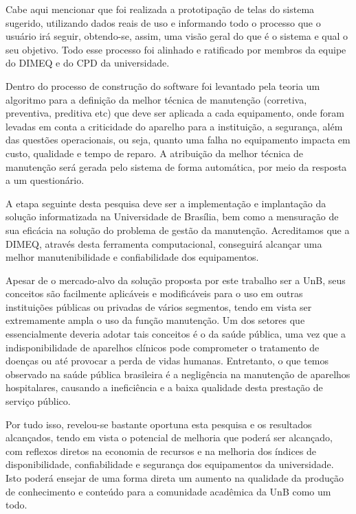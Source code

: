 Cabe aqui mencionar que foi realizada a prototipação de telas do sistema sugerido, utilizando dados reais de uso e informando todo o processo que o usuário irá seguir, obtendo-se, assim, uma visão geral do que é o sistema e qual o seu objetivo. Todo esse processo foi alinhado e ratificado por membros da equipe do DIMEQ e do CPD da universidade.

Dentro do processo de construção do software foi levantado pela teoria um algoritmo para a definição da melhor técnica de manutenção (corretiva, preventiva, preditiva etc) que deve ser aplicada a cada equipamento, onde foram levadas em conta a criticidade do aparelho para a instituição, a segurança, além das questões operacionais, ou seja, quanto uma falha no equipamento impacta em custo, qualidade e tempo de reparo. A atribuição da melhor técnica de manutenção será gerada pelo sistema de forma automática, por meio da resposta a um questionário.

A etapa seguinte desta pesquisa deve ser a implementação e implantação da solução informatizada na Universidade de Brasília, bem como a mensuração de sua eficácia na solução do problema de gestão da manutenção. Acreditamos que a DIMEQ, através desta ferramenta computacional, conseguirá alcançar uma melhor manutenibilidade e confiabilidade dos equipamentos.

Apesar de o mercado-alvo da solução proposta por este trabalho ser a UnB, seus conceitos são facilmente aplicáveis e modificáveis para o uso em outras instituições públicas ou privadas de vários segmentos, tendo em vista ser extremamente ampla o uso da função manutenção. Um dos setores que essencialmente deveria adotar tais conceitos é o da saúde pública, uma vez que a indisponibilidade de aparelhos clínicos pode comprometer o tratamento de doenças ou até provocar a perda de vidas humanas. Entretanto, o que temos observado na saúde pública brasileira é a negligência na manutenção de aparelhos hospitalares, causando a ineficiência e a baixa qualidade desta prestação de serviço público.

Por tudo isso, revelou-se bastante oportuna esta pesquisa e os resultados alcançados, tendo em vista o potencial de melhoria que poderá ser alcançado, com reflexos diretos na economia de recursos e na melhoria dos índices de disponibilidade, confiabilidade e segurança dos equipamentos da universidade. Isto poderá ensejar de uma forma direta um aumento na qualidade da produção de conhecimento e conteúdo para a comunidade acadêmica da UnB como um todo.


